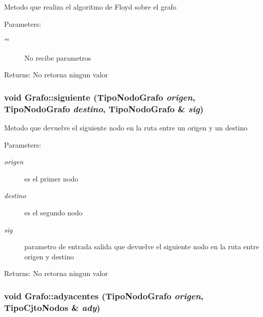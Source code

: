 Metodo que realiza el algoritmo de Floyd sobre el grafo \begin{Desc}
\item[Parameters:]
\begin{description}
\item[{\em \char`\"{}\char`\"{}}]No recibe parametros \end{description}
\end{Desc}
\begin{Desc}
\item[Returns:]No retorna ningun valor \end{Desc}
\hypertarget{classGrafo_c1517bf52e85a5dd1052f6f2b6f5b9a3}{
\subsubsection[siguiente]{\setlength{\rightskip}{0pt plus 5cm}void Grafo::siguiente (TipoNodoGrafo {\em origen}, \/  TipoNodoGrafo {\em destino}, \/  TipoNodoGrafo \& {\em sig})}}
\label{classGrafo_c1517bf52e85a5dd1052f6f2b6f5b9a3}


Metodo que devuelve el siguiente nodo en la ruta entre un origen y un destino \begin{Desc}
\item[Parameters:]
\begin{description}
\item[{\em origen}]es el primer nodo \item[{\em destino}]es el segundo nodo \item[{\em sig}]parametro de entrada salida que devuelve el siguiente nodo en la ruta entre origen y destino \end{description}
\end{Desc}
\begin{Desc}
\item[Returns:]No retorna ningun valor \end{Desc}
\hypertarget{classGrafo_416d9891de5c525d84875a922cf66a5a}{
\subsubsection[adyacentes]{\setlength{\rightskip}{0pt plus 5cm}void Grafo::adyacentes (TipoNodoGrafo {\em origen}, \/  TipoCjtoNodos \& {\em ady})}}
\label{classGrafo_416d9891de5c525d84875a922cf66a5a}


